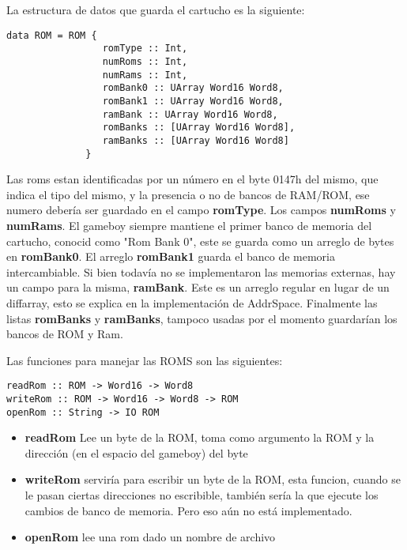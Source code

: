 \documentclass[a4paper,10pt]{report}
\begin{document}
La estructura de datos que guarda el cartucho es la siguiente:
\begin{verbatim}
data ROM = ROM { 
                 romType :: Int,
                 numRoms :: Int,
                 numRams :: Int, 
                 romBank0 :: UArray Word16 Word8,
                 romBank1 :: UArray Word16 Word8,
                 ramBank :: UArray Word16 Word8,
                 romBanks :: [UArray Word16 Word8],
                 ramBanks :: [UArray Word16 Word8]
              }
\end{verbatim}
Las roms estan identificadas por un número en el byte 0147h del mismo, que indica el tipo del mismo, y la presencia o no de bancos de RAM/ROM, ese numero debería ser guardado en el campo \textbf{romType}. Los campos \textbf{numRoms} y \textbf{numRams}. El gameboy siempre mantiene el primer banco de memoria del cartucho, conocid como "Rom Bank 0", este se guarda como un arreglo de bytes en \textbf{romBank0}. El arreglo \textbf{romBank1} guarda el banco de memoria intercambiable. Si bien todavía no se implementaron las memorias externas, hay un campo para la misma, \textbf{ramBank}. Este es un arreglo regular en lugar de un diffarray, esto se explica en la implementación de AddrSpace. Finalmente las listas \textbf{romBanks} y \textbf{ramBanks}, tampoco usadas por el momento guardarían los bancos de ROM y Ram.

Las funciones para manejar las ROMS son las siguientes: 
\begin{verbatim}
readRom :: ROM -> Word16 -> Word8
writeRom :: ROM -> Word16 -> Word8 -> ROM
openRom :: String -> IO ROM
\end{verbatim}
\begin{itemize}
  \item \textbf{readRom} Lee un byte de la ROM, toma como argumento la ROM y la dirección (en el espacio del gameboy) del byte
  \item \textbf{writeRom} serviría para escribir un byte de la ROM, esta funcion, cuando se le pasan ciertas direcciones no escribible, también sería la que ejecute los cambios de banco de memoria. Pero eso aún no está implementado.
  \item \textbf{openRom} lee una rom dado un nombre de archivo
\end{itemize}
\end{document}
